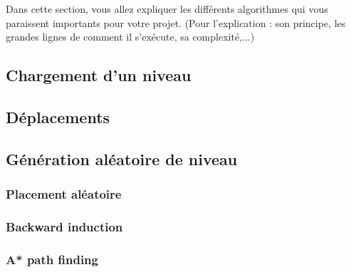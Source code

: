 \documentclass[../main.tex]{subfiles}
\begin{document}
Dans cette section, vous allez expliquer les différents algorithmes qui vous paraissent importants pour votre projet. (Pour l'explication : son principe, les grandes lignes de comment il s'exécute, sa complexité,...)

\subsection{Chargement d'un niveau}

\subsection{Déplacements}

\subsection{Génération aléatoire de niveau}
\subsubsection{Placement aléatoire}
\subsubsection{Backward induction}
\subsubsection{A* path finding}
\end{document}
